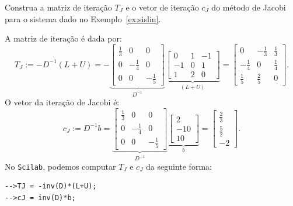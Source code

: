 \begin{ex}
  Construa a matriz de iteração $T_J$ e o vetor de iteração $c_J$ do método de Jacobi para o sistema dado no Exemplo~\ref{ex:sislin}. 
\end{ex}
\begin{sol}
  A matriz de iteração é dada por:
  \begin{equation*}
    T_J := -D^{-1}(L + U) = -
    \underbrace{\begin{bmatrix}
      \frac{1}{3} & 0 & 0\\
      0 & -\frac{1}{4} & 0\\
      0 & 0 & -\frac{1}{5}
    \end{bmatrix}}_{D^{-1}}
  \underbrace{\begin{bmatrix}
    0 & 1 & -1\\
    -1 & 0 & 1\\
    1 & 2 & 0
  \end{bmatrix}}_{(L + U)} =
\begin{bmatrix}
  0 & -\frac{1}{3} & \frac{1}{3}\\
  -\frac{1}{4} & 0 & \frac{1}{4}\\
  \frac{1}{5} & \frac{2}{5} & 0
\end{bmatrix}.
  \end{equation*}
O vetor da iteração de Jacobi é:
\begin{equation*}
  c_J := D^{-1}b = 
    \underbrace{\begin{bmatrix}
      \frac{1}{3} & 0 & 0\\
      0 & -\frac{1}{4} & 0\\
      0 & 0 & -\frac{1}{5}
    \end{bmatrix}}_{D^{-1}}
    \underbrace{\begin{bmatrix}
      2\\
      -10\\
      10
    \end{bmatrix}}_{b} = 
    \begin{bmatrix}
      \frac{2}{3}\\
      \frac{5}{2}\\
      -2
    \end{bmatrix}.
\end{equation*}
\ifisscilab
No \verb+Scilab+, podemos computar $T_J$ e $c_J$ da seguinte forma:
\begin{verbatim}
-->TJ = -inv(D)*(L+U);
-->cJ = inv(D)*b;
\end{verbatim}
\fi
\end{sol}


